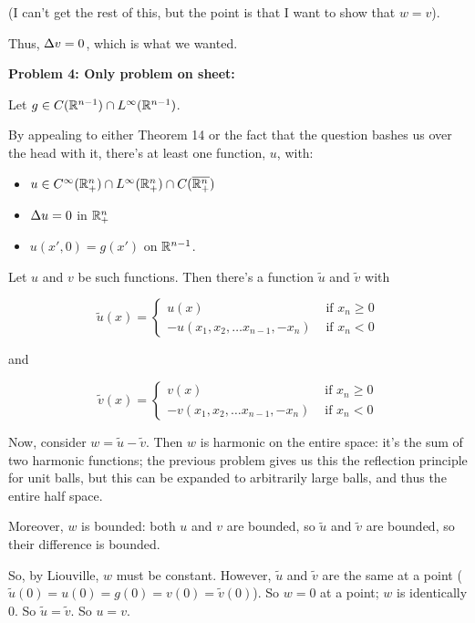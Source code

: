 \documentclass[a4paper,12pt]{article}
\begin{document}
(I can't get the rest of this, but the point is that I want to show that $w = v$).

Thus, $\Delta v = 0$, which is what we wanted.

\shunt

{\bf Problem 4: Only problem on sheet:}

Let $g \in C(\mathbb{R}^{n-1}) \cap L^\infty (\mathbb{R}^{n-1})$.

By appealing to either Theorem 14 or the fact that the question bashes us over the head with it, there's at least one function, $u$, with:

\begin{itemize}
\item $u \in C^\infty( \mathbb{R}^n_+) \cap L^\infty  (\mathbb{R}^n_+) \cap C(\overline{\mathbb{R}^n_+})$
\item $\Delta u = 0$ in $\mathbb{R}^n_+$
\item $u(x',0) = g(x')$ on $\mathbb{R}^{n-1}$.
\end{itemize}

Let $u$ and $v$ be such functions. Then there's a function $\tilde{u}$ and $\tilde{v}$ with

\begin{displaymath}
\tilde{u}(x) =
   \left\{
     \begin{array}{lr}
       u(x) & \text{ if } x_n \geq 0\\
       -u(x_1,x_2, \ldots x_{n-1}, -x_n) & \text{ if } x_n < 0
     \end{array}
   \right.
\end{displaymath}

and

\begin{displaymath}
\tilde{v}(x) =
   \left\{
     \begin{array}{lr}
       v(x) & \text{ if } x_n \geq 0\\
       -v(x_1,x_2, \ldots x_{n-1}, -x_n) & \text{ if } x_n < 0
     \end{array}
   \right.
\end{displaymath}

Now, consider $w = \tilde{u} - \tilde{v}$. Then $w$ is harmonic on the entire space: it's the sum of two harmonic functions; the previous problem gives us this the reflection principle for unit balls, but this can be expanded to arbitrarily large balls, and thus the entire half space.

Moreover, $w$ is bounded: both $u$ and $v$ are bounded, so $\tilde{u}$ and $\tilde{v}$ are bounded, so their difference is bounded.

So, by Liouville, $w$ must be constant. However, $\tilde{u}$ and $\tilde{v}$ are the same at a point ($\tilde{u}(0) = u(0) = g(0) = v(0) = \tilde{v}(0)$). So $w = 0$ at a point; $w$ is identically $0$. So $\tilde{u} = \tilde{v}$. So $u = v$.

\shunt
\end{document}
